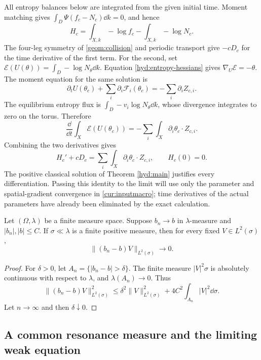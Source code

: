 All entropy balances below are integrated from the given initial time.
Moment matching gives $\int_D\Psi(f_c-N_c)\dd k=0$, and hence
\[
 H_c=\int_{X,k}-\log f_c-\int_{X,k}-\log N_c.
\]
The four-leg symmetry of \eqref{geom:collision} and periodic transport
give $-cD_c$ for the time derivative of the first term.
For the second, set
$\mathcal E(U(\theta))=\int_D-\log N_\theta\dd k$.
Equation \eqref{hyd:entropy-hessians} gives
$\nabla_U\mathcal E=-\theta$. The moment equation for the same solution is
\begin{equation}\label{cur:exactmoments}
 \partial_tU(\theta_c)+\sum_i\partial_i\mathcal F_i(\theta_c)
                  =-\sum_i\partial_iZ_{c,i}.
\end{equation}
The equilibrium entropy flux is $\int_D-v_i\log N_\theta\dd k$,
whose divergence integrates to zero on the torus. Therefore
\[
 \frac{\dd}{\dd t}\int_X\mathcal E(U(\theta_c))
             =-\sum_i\int_X\partial_i\theta_c\cdot Z_{c,i}.
\]
Combining the two derivatives gives
\begin{equation}\label{cur:entropyidentity}
 H_c'+cD_c=\sum_i\int_X\partial_i\theta_c\cdot Z_{c,i},
              \qquad H_c(0)=0.
\end{equation}
The positive classical solution of Theorem \ref{hyd:main} justifies
every differentiation. Passing this identity to the limit will use
only the parameter and spatial-gradient convergence in
\eqref{cur:inputmacro}; time derivatives of the actual parameters
have already been eliminated by the exact calculation.

\begin{lemma}\label{cur:multiplierlemma}
 Let $(\Omega,\lambda)$ be a finite measure space. Suppose $b_n\to b$
 in $\lambda$-measure and $|b_n|,|b|\le C$.
 If $\sigma\ll\lambda$ is a finite positive measure, then for every
 fixed $V\in L^2(\sigma)$,
 \[
                 \|(b_n-b)V\|_{L^2(\sigma)}\longrightarrow0.
 \]
\end{lemma}
\begin{proof}
 For $\delta>0$, let $A_n=\{|b_n-b|>\delta\}$.
 The finite measure $|V|^2\sigma$ is absolutely continuous with respect
 to $\lambda$, and $\lambda(A_n)\to0$. Thus
 \[
 \|(b_n-b)V\|_{L^2(\sigma)}^2
 \le\delta^2\|V\|_{L^2(\sigma)}^2
                  +4C^2\int_{A_n}|V|^2\dd\sigma.
 \]
 Let $n\to\infty$ and then $\delta\downarrow0$.
\end{proof}

\subsection{A common resonance measure and the limiting weak equation}


